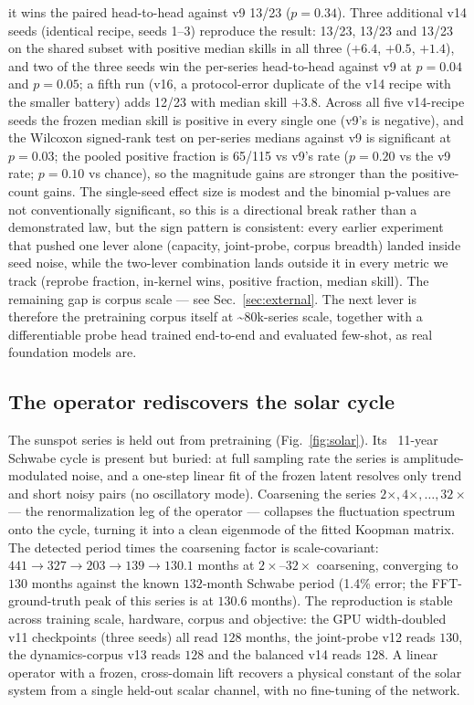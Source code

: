\documentclass[11pt]{article}
\begin{document}
it wins the paired head-to-head against v9 13/23 ($p=0.34$). Three
additional v14 seeds (identical recipe, seeds 1--3) reproduce the
result: 13/23, 13/23 and 13/23 on the shared subset with positive
median skills in all three ($+6.4$, $+0.5$, $+1.4$), and two of the
three seeds win the per-series head-to-head against v9 at $p=0.04$ and
$p=0.05$; a fifth run (v16, a protocol-error duplicate of the v14
recipe with the smaller battery) adds 12/23 with median skill $+3.8$.
Across all five v14-recipe seeds the frozen median skill is positive in
every single one (v9's is negative), and the Wilcoxon signed-rank test
on per-series medians against v9 is significant at $p=0.03$; the
pooled positive fraction is 65/115 vs v9's rate ($p=0.20$ vs the v9
rate; $p=0.10$ vs chance), so the magnitude gains are stronger than
the positive-count gains. The single-seed effect size is modest and the binomial p-values are not
conventionally significant,
so this is a directional break rather than a demonstrated law, but the
sign pattern is consistent: every earlier experiment that pushed one
lever alone (capacity, joint-probe, corpus breadth) landed inside seed
noise, while the two-lever combination lands outside it in every
metric we track (reprobe fraction, in-kernel wins, positive fraction,
median skill). The remaining gap is corpus scale --- see
Sec.~\ref{sec:external}. The next lever is therefore the pretraining
corpus itself at \textasciitilde80k-series scale, together with a
differentiable probe head trained end-to-end and evaluated few-shot, as
real foundation models are.

\subsection{The operator rediscovers the solar cycle}
\label{sec:solar}
The sunspot series is held out from pretraining (Fig.~\ref{fig:solar}). Its
~11-year Schwabe cycle is present but buried: at full sampling rate the
series is amplitude-modulated noise, and a one-step linear fit of the frozen
latent resolves only trend and short noisy pairs (no oscillatory mode).
Coarsening the series $2\times, 4\times, \dots, 32\times$ --- the
renormalization leg of the operator --- collapses the fluctuation spectrum
onto the cycle, turning it into a clean eigenmode of the fitted Koopman
matrix. The detected period times the coarsening factor is
scale-covariant: $441 \rightarrow 327 \rightarrow 203 \rightarrow 139
\rightarrow 130.1$ months at $2\times\text{--}32\times$ coarsening,
converging to $130$ months against the known $132$-month Schwabe period
(1.4\% error; the FFT-ground-truth peak of this series is at $130.6$
months). The reproduction is stable across training scale, hardware,
corpus and objective: the GPU width-doubled v11 checkpoints (three
seeds) all read $128$ months, the joint-probe v12 reads $130$, the
dynamics-corpus v13 reads $128$ and the balanced v14 reads $128$.
A linear operator with a frozen, cross-domain lift recovers a
physical constant of the solar system from a single held-out scalar
channel, with no fine-tuning of the network.
\end{document}
